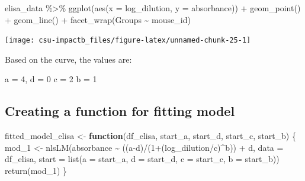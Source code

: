 \documentclass[
]{book}
\newenvironment{Shaded}{\begin{snugshade}}{\end{snugshade}}
\newcommand{\AttributeTok}[1]{\textcolor[rgb]{0.77,0.63,0.00}{#1}}
\newcommand{\ControlFlowTok}[1]{\textcolor[rgb]{0.13,0.29,0.53}{\textbf{#1}}}
\newcommand{\DecValTok}[1]{\textcolor[rgb]{0.00,0.00,0.81}{#1}}
\newcommand{\FunctionTok}[1]{\textcolor[rgb]{0.00,0.00,0.00}{#1}}
\newcommand{\NormalTok}[1]{#1}
\newcommand{\OtherTok}[1]{\textcolor[rgb]{0.56,0.35,0.01}{#1}}
\newcommand{\SpecialCharTok}[1]{\textcolor[rgb]{0.00,0.00,0.00}{#1}}
\begin{document}
\begin{Shaded}
\begin{Highlighting}[]
\NormalTok{elisa\_data }\SpecialCharTok{\%\textgreater{}\%}
  \FunctionTok{ggplot}\NormalTok{(}\FunctionTok{aes}\NormalTok{(}\AttributeTok{x =}\NormalTok{ log\_dilution, }\AttributeTok{y =}\NormalTok{ absorbance)) }\SpecialCharTok{+}
  \FunctionTok{geom\_point}\NormalTok{() }\SpecialCharTok{+}
  \FunctionTok{geom\_line}\NormalTok{() }\SpecialCharTok{+} 
  \FunctionTok{facet\_wrap}\NormalTok{(Groups }\SpecialCharTok{\textasciitilde{}}\NormalTok{ mouse\_id)}
\end{Highlighting}
\end{Shaded}

\begin{center}\texttt{[image: csu-impactb\_files/figure-latex/unnamed-chunk-25-1]} \end{center}

Based on the curve, the values are:

a = 4,
d = 0
c = 2
b = 1

\hypertarget{creating-a-function-for-fitting-model}{%
\subsection{Creating a function for fitting model}\label{creating-a-function-for-fitting-model}}

\begin{Shaded}
\begin{Highlighting}[]
\NormalTok{fitted\_model\_elisa }\OtherTok{\textless{}{-}} \ControlFlowTok{function}\NormalTok{(df\_elisa, }
\NormalTok{                               start\_a, start\_d, }
\NormalTok{                               start\_c, start\_b) \{}
\NormalTok{  mod\_1 }\OtherTok{\textless{}{-}} \FunctionTok{nlsLM}\NormalTok{(absorbance }\SpecialCharTok{\textasciitilde{}} 
\NormalTok{                   ((a}\SpecialCharTok{{-}}\NormalTok{d)}\SpecialCharTok{/}\NormalTok{(}\DecValTok{1}\SpecialCharTok{+}\NormalTok{(log\_dilution}\SpecialCharTok{/}\NormalTok{c)}\SpecialCharTok{\^{}}\NormalTok{b)) }\SpecialCharTok{+}\NormalTok{ d,}
\AttributeTok{data =}\NormalTok{ df\_elisa,}
\AttributeTok{start =} \FunctionTok{list}\NormalTok{(}\AttributeTok{a =}\NormalTok{ start\_a, }\AttributeTok{d =}\NormalTok{ start\_d, }\AttributeTok{c =}\NormalTok{ start\_c, }\AttributeTok{b =}\NormalTok{ start\_b))}
  \FunctionTok{return}\NormalTok{(mod\_1)}
\NormalTok{\}}
\end{Highlighting}
\end{Shaded}
\end{document}
